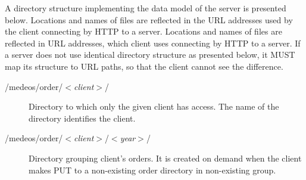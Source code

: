 \documentclass[a4paper]{article}
\begin{document}
A directory structure implementing the data model of the server is presented below. Locations
and names of files are reflected in the URL addresses used by the client connecting by HTTP
to a server. Locations and names of files are reflected in URL addresses, which client
uses connecting by HTTP to a server. If a server does not use identical directory structure
as presented below, it MUST map its structure to URL paths, so that the client cannot see 
the difference.

\begin{description}
	\item[/medeos/order/$<$\textit{client}$>$/]
	Directory to which only the given client has access. The name of the directory identifies
	the client.

	\item[/medeos/order/$<$\textit{client}$>$/$<$\emph{year}$>$/]
	Directory grouping client's orders. It is created on demand when the client makes PUT to 
	a non-existing order directory in non-existing group.


\end{description}
\end{document}
